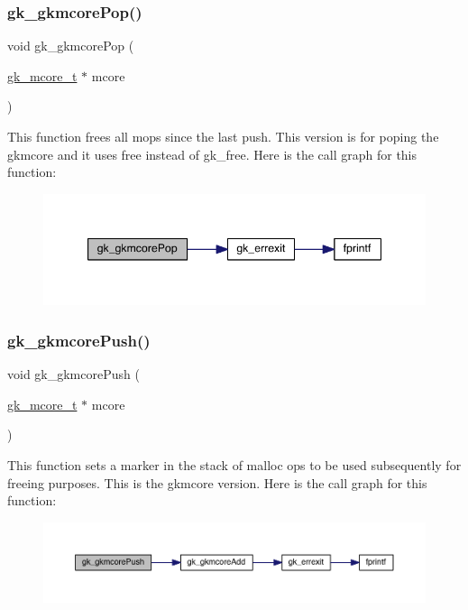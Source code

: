 \subsubsection{\texorpdfstring{gk\+\_\+gkmcore\+Pop()}{gk\_gkmcorePop()}}
{\footnotesize\ttfamily void gk\+\_\+gkmcore\+Pop (\begin{DoxyParamCaption}\item[{\hyperlink{a00682}{gk\+\_\+mcore\+\_\+t} $\ast$}]{mcore }\end{DoxyParamCaption})}

This function frees all mops since the last push. This version is for poping the gkmcore and it uses free instead of gk\+\_\+free. Here is the call graph for this function\+:\nopagebreak
\begin{figure}[H]
\begin{center}
\leavevmode
\includegraphics[width=344pt]{a00107_ad8c9738b8a6a34af2aa8f271fe14cfa9_cgraph}
\end{center}
\end{figure}
\mbox{\label{a00107_a7e52f5d61f36e5c6a9e6634d90dadf2d}} 
\subsubsection{\texorpdfstring{gk\+\_\+gkmcore\+Push()}{gk\_gkmcorePush()}}
{\footnotesize\ttfamily void gk\+\_\+gkmcore\+Push (\begin{DoxyParamCaption}\item[{\hyperlink{a00682}{gk\+\_\+mcore\+\_\+t} $\ast$}]{mcore }\end{DoxyParamCaption})}

This function sets a marker in the stack of malloc ops to be used subsequently for freeing purposes. This is the gkmcore version. Here is the call graph for this function\+:\nopagebreak
\begin{figure}[H]
\begin{center}
\leavevmode
\includegraphics[width=350pt]{a00107_a7e52f5d61f36e5c6a9e6634d90dadf2d_cgraph}
\end{center}
\end{figure}
\mbox{\label{a00107_a366348b623d380f773e5946011e14059}} 
